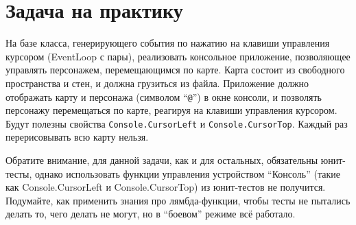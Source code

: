 \documentclass{../../text-style}
\begin{document}
\maketitle
\thispagestyle{empty}

\section{Задача на практику}

На базе класса, генерирующего события по нажатию на клавиши управления курсором (EventLoop с пары), реализовать консольное приложение, позволяющее управлять персонажем, перемещающимся по карте. Карта состоит из свободного пространства и стен, и должна грузиться из файла. Приложение должно отображать карту и персонажа (символом \enquote{\texttt{@}}) в окне консоли, и позволять персонажу перемещаться по карте, реагируя на клавиши управления курсором. Будут полезны свойства \texttt{Console.CursorLeft} и \texttt{Console.CursorTop}. Каждый раз перерисовывать всю карту нельзя.

Обратите внимание, для данной задачи, как и для остальных, обязательны юнит-тесты, однако использовать функции управления устройством \enquote{Консоль} (такие как Console.CursorLeft и Console.CursorTop) из юнит-тестов не получится. Подумайте, как применить знания про лямбда-функции, чтобы тесты не пытались делать то, чего делать не могут, но в \enquote{боевом} режиме всё работало.
\end{document}
